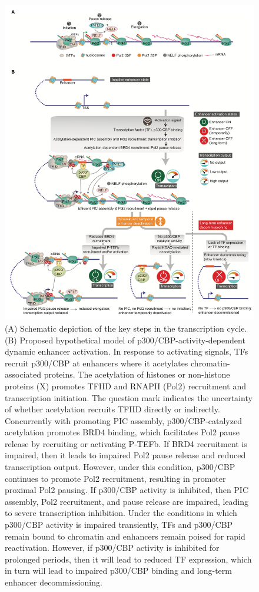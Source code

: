 \begin{figure}
\centering
\includegraphics[width=\textwidth]{../_resources/Screenshot_2022-12-19_at_16-39-14.png}
\caption{(A) Schematic depiction of the key steps in the transcription cycle.
(B) Proposed hypothetical model of p300/CBP-activity-dependent dynamic enhancer activation. In response to activating signals, TFs recruit p300/CBP at enhancers where it acetylates chromatin-associated proteins. The acetylation of histones or non-histone proteins (X) promotes TFIID and RNAPII (Pol2) recruitment and transcription initiation. The question mark indicates the uncertainty of whether acetylation recruits TFIID directly or indirectly. Concurrently with promoting PIC assembly, p300/CBP-catalyzed acetylation promotes BRD4 binding, which facilitates Pol2 pause release by recruiting or activating P-TEFb. If BRD4 recruitment is impaired, then it leads to impaired Pol2 pause release and reduced transcription output. However, under this condition, p300/CBP continues to promote Pol2 recruitment, resulting in promoter proximal Pol2 pausing. If p300/CBP activity is inhibited, then PIC assembly, Pol2 recruitment, and pause release are impaired, leading to severe transcription inhibition. Under the conditions in which p300/CBP activity is impaired transiently, TFs and p300/CBP remain bound to chromatin and enhancers remain poised for rapid reactivation. However, if p300/CBP activity is inhibited for prolonged periods, then it will lead to reduced TF expression, which in turn will lead to impaired p300/CBP binding and long-term enhancer decommissioning.}
\end{figure}

